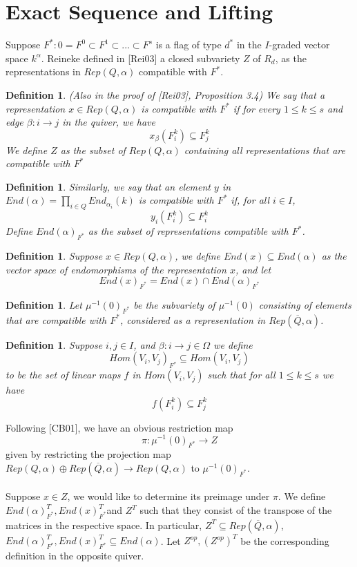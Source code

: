 \documentclass[12pt]{amsart}
\theoremstyle{plain}
\newtheorem{defn}[thm]{Definition}
\theoremstyle{definition}
\theoremstyle{remark}
\begin{document}
\section{Exact Sequence and Lifting}
\hspace{-12pt}Suppose $F^*:0=F^0\subset F^1\subset...\subset F^s$ is a flag of type $d^*$ in the $I$-graded vector space $k^{\alpha}$. Reineke defined in [Rei03] a closed subvariety $Z$ of $R_d$, as the representations in $Rep(Q,\alpha)$ compatible with $F^*$.
\begin{defn} (Also in the proof of [Rei03], Proposition 3.4) We say that a representation $x\in Rep(Q,\alpha)$ is compatible with $F^*$ if for every $1\leq k\leq s$ and edge $\beta:i\to j$ in the quiver, we have 
$$x_{\beta}(F_i^k)\subseteq F_j^k$$
We define $Z$ as the subset of $Rep(Q,\alpha)$ containing all representations that are compatible with $F^*$
\end{defn}
\begin{defn} Similarly, we say that an element $y$ in $End(\alpha)=\displaystyle \prod_{i\in Q}End_{\alpha_i}(k)$ is compatible with $F^*$ if, for all $i\in I$,
$$y_i(F_i^k)\subseteq F_i^k$$
Define $End(\alpha)_{F^*}$ as the subset of representations compatible with $F^*$.
\end{defn}
\begin{defn} Suppose $x\in Rep(Q,\alpha)$, we define $End(x)\subseteq End(\alpha)$ as the vector space of endomorphisms of the representation $x$, and let
$$End(x)_{F^*}=End(x)\cap End(\alpha)_{F^*}$$
\end{defn}
\begin{defn} Let $\mu^{-1}(0)_{F^*}$ be the subvariety of $\mu^{-1}(0)$ consisting of elements that are compatible with $F^*$, considered as a representation in $Rep(\overline{Q},\alpha)$.
\end{defn}
\begin{defn} Suppose $i,j\in I$, and $\beta:i\to j\in\Omega$ we define 
$$Hom(V_i,V_j)_{F^*}\subseteq Hom(V_i,V_j)$$
to be the set of linear maps $f$ in $Hom(V_i,V_j)$ such that for all $1\leq k\leq s$ we have 
$$f(F_i^k)\subseteq F_j^k$$
\end{defn}
\hspace{-12pt}Following [CB01], we have an obvious restriction map 
$$\pi:\mu^{-1}(0)_{F^*}\to Z$$
given by restricting the projection map $Rep(Q,\alpha)\oplus Rep(\overline{Q},\alpha)\to Rep(Q,\alpha)$ to $\mu^{-1}(0)_{F^*}$.
\\~\\ Suppose $x\in Z$, we would like to determine its preimage under $\pi$. We define $End(\alpha)^{T}_{F^*},End(x)_{F^*}^T$and $Z^T$ such that they consist of the transpose of the matrices in the respective space. In particular, $Z^T\subseteq Rep(\overline{Q},\alpha)$, $End(\alpha)^T_{F^*},End(x)_{F^*}^T\subseteq End(\alpha)$. Let $Z^{op},(Z^{op})^T$ be the corresponding definition in the opposite quiver.
\end{document}
